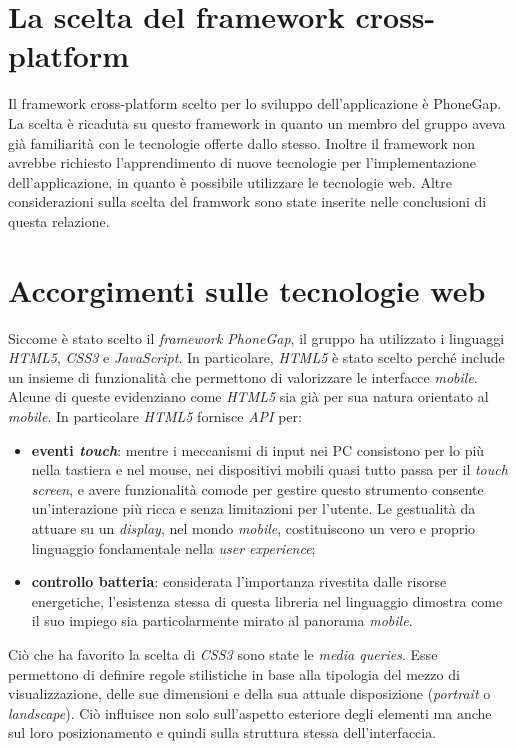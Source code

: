 \documentclass[12pt, a4paper, titlepage]{report}
\begin{document}
	\section{La scelta del framework cross-platform}
	
	Il framework cross-platform scelto per lo sviluppo dell'applicazione è PhoneGap. La scelta è ricaduta su questo framework in quanto un membro del gruppo aveva già familiarità con le tecnologie offerte dallo stesso. Inoltre il framework non avrebbe richiesto l'apprendimento di nuove tecnologie per l'implementazione dell'applicazione, in quanto è possibile utilizzare le tecnologie web. Altre considerazioni sulla scelta del framwork sono state inserite nelle conclusioni di questa relazione.
	
	\section{Accorgimenti sulle tecnologie web}
	
	Siccome è stato scelto il \textit{framework PhoneGap}, il gruppo ha utilizzato i linguaggi \textit{HTML5}, \textit{CSS3} e \textit{JavaScript}. In particolare, \textit{HTML5} è stato scelto perché include un insieme di funzionalità che permettono di valorizzare le interfacce \textit{mobile}. Alcune di queste evidenziano come \textit{HTML5} sia già per sua natura orientato al \textit{mobile}. In particolare \textit{HTML5} fornisce \textit{API} per:
	\begin{itemize}
		\item \textbf{eventi \textit{touch}}: mentre i meccanismi di input nei PC consistono per lo più nella tastiera e nel mouse, nei dispositivi mobili quasi tutto passa per il \textit{touch screen}, e avere funzionalità comode per gestire questo strumento consente un'interazione più ricca e senza limitazioni per l'utente. Le gestualità da attuare su un \textit{display}, nel mondo \textit{mobile}, costituiscono un vero e proprio linguaggio fondamentale nella \textit{user experience};
		\item \textbf{controllo batteria}: considerata l'importanza rivestita dalle risorse energetiche, l'esistenza stessa di questa libreria nel linguaggio dimostra come il suo impiego sia particolarmente mirato al panorama \textit{mobile}.
	\end{itemize}
	
	Ciò che ha favorito la scelta di \textit{CSS3} sono state le \textit{media queries}. Esse permettono di definire regole stilistiche in base alla tipologia del mezzo di visualizzazione, delle sue dimensioni e della sua attuale disposizione (\textit{portrait} o \textit{landscape}). Ciò influisce non solo sull'aspetto esteriore degli elementi ma anche sul loro posizionamento e quindi sulla struttura stessa dell'interfaccia.
	
\end{document}
